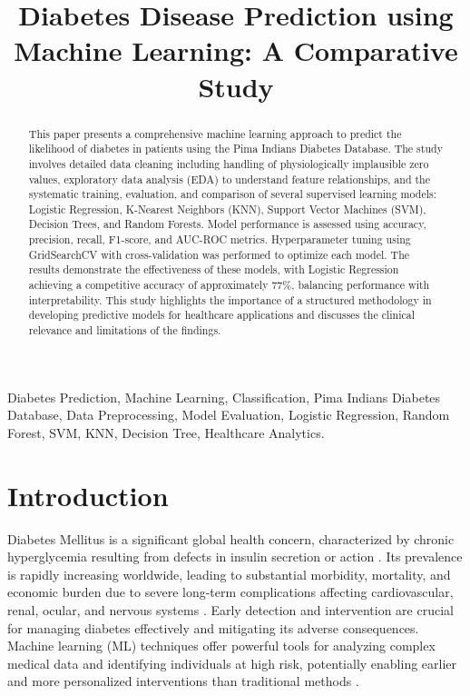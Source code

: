 \documentclass[conference]{IEEEtran}
\title{Diabetes Disease Prediction using Machine Learning: A Comparative Study}
\author{\IEEEauthorblockN{Md Khateebur Rab, Alok Gupta and Varad Gupta}
\IEEEauthorblockA{Department of Computer Science\\
Indian Institute of Information technology, Ranchi\\
Jharkhand, India}}
\begin{document}
\maketitle

\begin{abstract}
This paper presents a comprehensive machine learning approach to predict the likelihood of diabetes in patients using the Pima Indians Diabetes Database. The study involves detailed data cleaning including handling of physiologically implausible zero values, exploratory data analysis (EDA) to understand feature relationships, and the systematic training, evaluation, and comparison of several supervised learning models: Logistic Regression, K-Nearest Neighbors (KNN), Support Vector Machines (SVM), Decision Trees, and Random Forests. Model performance is assessed using accuracy, precision, recall, F1-score, and AUC-ROC metrics. Hyperparameter tuning using GridSearchCV with cross-validation was performed to optimize each model. The results demonstrate the effectiveness of these models, with Logistic Regression achieving a competitive accuracy of approximately 77\%, balancing performance with interpretability. This study highlights the importance of a structured methodology in developing predictive models for healthcare applications and discusses the clinical relevance and limitations of the findings.
\end{abstract}

\begin{IEEEkeywords}
Diabetes Prediction, Machine Learning, Classification, Pima Indians Diabetes Database, Data Preprocessing, Model Evaluation, Logistic Regression, Random Forest, SVM, KNN, Decision Tree, Healthcare Analytics.
\end{IEEEkeywords}

\section{Introduction}
Diabetes Mellitus is a significant global health concern, characterized by chronic hyperglycemia resulting from defects in insulin secretion or action \cite{who_diabetes}. Its prevalence is rapidly increasing worldwide, leading to substantial morbidity, mortality, and economic burden due to severe long-term complications affecting cardiovascular, renal, ocular, and nervous systems \cite{idf_atlas, economic_impact}. Early detection and intervention are crucial for managing diabetes effectively and mitigating its adverse consequences. Machine learning (ML) techniques offer powerful tools for analyzing complex medical data and identifying individuals at high risk, potentially enabling earlier and more personalized interventions than traditional methods \cite{ml_healthcare_review}.
\end{document}

